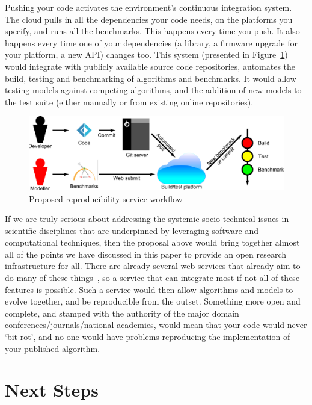 \documentclass[a4paper,11pt]{article}
\begin{document}
Pushing your code activates the environment's continuous integration
system.  The cloud pulls in all the dependencies your code needs, on
the platforms you specify, and runs all the benchmarks. This happens
every time you push. It also happens every time one of your
dependencies (a library, a firmware upgrade for your platform, a new
API) changes too. This system (presented in Figure~\ref{fig:workflow})
would integrate with publicly available source code repositories,
automates the build, testing and benchmarking of algorithms and
benchmarks. It would allow testing models against competing
algorithms, and the addition of new models to the test suite (either
manually or from existing online repositories).

\begin{figure}[!ht]
\centering
\includegraphics[width=0.9\columnwidth]{images/workflow.png}
\caption{Proposed reproducibility service workflow}
\label{fig:workflow} 
\end{figure}

If we are truly serious about addressing the systemic socio-technical
issues in scientific disciplines that are underpinned by leveraging
software and computational techniques, then the proposal above would
bring together almost all of the points we have discussed in this
paper to provide an open research infrastructure for all. There are
already several web services that already aim to do many of these
things~\cite{rollins-et-al:2014,stodden-et-al:2015}, so a service that
can integrate most if not all of these features is possible. Such a
service would then allow algorithms and models to evolve together, and
be reproducible from the outset. Something more open and complete, and
stamped with the authority of the major domain
conferences/journals/national academies, would mean that your code
would never `bit-rot', and no one would have problems reproducing the
implementation of your published algorithm.


\section{Next Steps}
\end{document}
